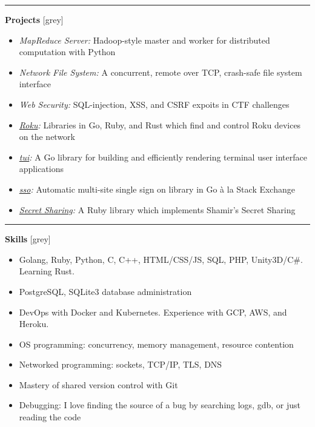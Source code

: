 \documentclass[10pt]{article}
\newcommand{\sectiontitle}[1]{
  {\color{grey}\rule[0.15cm]{0.5cm}{0.5pt}}
  {\Large\textbf{#1}}
  \xrfill[0.1cm]{0.5pt}[grey]
}
\newcommand{\itempad}{\vspace{0.1in}}
\begin{document}
  \sectiontitle{Projects}
  \begin{itemize}[leftmargin=1em]
    \setlength\itemsep{-0.3em}
    \item \textit{MapReduce Server:} Hadoop-style master and worker for distributed computation with Python
    \item \textit{Network File System:} A concurrent, remote over TCP, crash-safe file system interface
    \item \textit{Web Security:} SQL-injection, XSS, and CSRF expoits in CTF challenges
    \item \textit{\href{https://github.com/shreve/go-roku}{Roku}:} Libraries in Go, Ruby, and Rust which find and control Roku devices on the network
    \item \textit{\href{https://github.com/shreve/tui}{tui}:} A Go library for building and efficiently rendering terminal user interface applications
    \item \textit{\href{https://github.com/shreve/sso}{sso}:} Automatic multi-site single sign on library in Go \`{a} la Stack Exchange
    \item \textit{\href{https://github.com/shrve/shared-secret}{Secret Sharing}:} A Ruby library which implements Shamir's Secret Sharing
  \end{itemize}
\itempad

  \sectiontitle{Skills}

  \begin{itemize}[leftmargin=1em]
    \setlength\itemsep{-0.3em}
    \item{Golang, Ruby, Python, C, C++, HTML/CSS/JS, SQL, PHP, Unity3D/C\#. Learning Rust.}
    \item{PostgreSQL, SQLite3 database administration}
    \item{DevOps with Docker and Kubernetes. Experience with GCP, AWS, and Heroku.}
    \item{OS programming: concurrency, memory management, resource contention}
    \item{Networked programming: sockets, TCP/IP, TLS, DNS}
    \item{Mastery of shared version control with Git}
    \item{Debugging: I love finding the source of a bug by searching logs, gdb, or just reading the code}
  \end{itemize}
\end{document}
